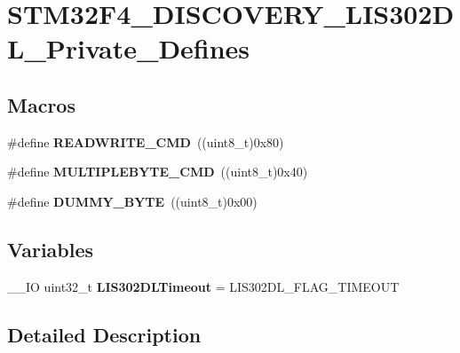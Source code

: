 \hypertarget{group___s_t_m32_f4___d_i_s_c_o_v_e_r_y___l_i_s302_d_l___private___defines}{\section{S\-T\-M32\-F4\-\_\-\-D\-I\-S\-C\-O\-V\-E\-R\-Y\-\_\-\-L\-I\-S302\-D\-L\-\_\-\-Private\-\_\-\-Defines}
\label{group___s_t_m32_f4___d_i_s_c_o_v_e_r_y___l_i_s302_d_l___private___defines}
}
\subsection*{Macros}
\begin{DoxyCompactItemize}
\item 
\hypertarget{group___s_t_m32_f4___d_i_s_c_o_v_e_r_y___l_i_s302_d_l___private___defines_ga5a85ad7ff6c71218205aa24a7b9e9709}{\#define {\bfseries R\-E\-A\-D\-W\-R\-I\-T\-E\-\_\-\-C\-M\-D}~((uint8\-\_\-t)0x80)}\label{group___s_t_m32_f4___d_i_s_c_o_v_e_r_y___l_i_s302_d_l___private___defines_ga5a85ad7ff6c71218205aa24a7b9e9709}

\item 
\hypertarget{group___s_t_m32_f4___d_i_s_c_o_v_e_r_y___l_i_s302_d_l___private___defines_ga8978e114e63e88d9763967ab84388774}{\#define {\bfseries M\-U\-L\-T\-I\-P\-L\-E\-B\-Y\-T\-E\-\_\-\-C\-M\-D}~((uint8\-\_\-t)0x40)}\label{group___s_t_m32_f4___d_i_s_c_o_v_e_r_y___l_i_s302_d_l___private___defines_ga8978e114e63e88d9763967ab84388774}

\item 
\hypertarget{group___s_t_m32_f4___d_i_s_c_o_v_e_r_y___l_i_s302_d_l___private___defines_gadc81a065700d3af56b6fb631585e3641}{\#define {\bfseries D\-U\-M\-M\-Y\-\_\-\-B\-Y\-T\-E}~((uint8\-\_\-t)0x00)}\label{group___s_t_m32_f4___d_i_s_c_o_v_e_r_y___l_i_s302_d_l___private___defines_gadc81a065700d3af56b6fb631585e3641}

\end{DoxyCompactItemize}
\subsection*{Variables}
\begin{DoxyCompactItemize}
\item 
\hypertarget{group___s_t_m32_f4___d_i_s_c_o_v_e_r_y___l_i_s302_d_l___private___defines_ga943b294f0781c528d4d85a5f1f54d8c9}{\-\_\-\-\_\-\-I\-O uint32\-\_\-t {\bfseries L\-I\-S302\-D\-L\-Timeout} = L\-I\-S302\-D\-L\-\_\-\-F\-L\-A\-G\-\_\-\-T\-I\-M\-E\-O\-U\-T}\label{group___s_t_m32_f4___d_i_s_c_o_v_e_r_y___l_i_s302_d_l___private___defines_ga943b294f0781c528d4d85a5f1f54d8c9}

\end{DoxyCompactItemize}


\subsection{Detailed Description}
